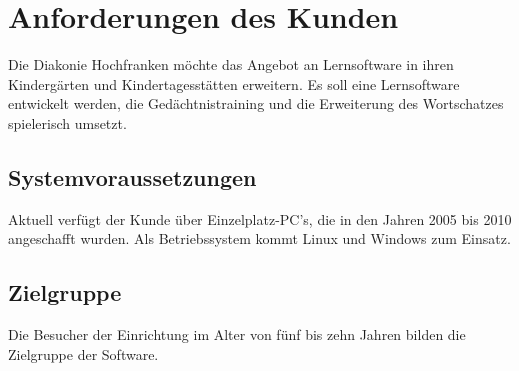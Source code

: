 \clearpage

\chapter{Anforderungen des Kunden}
Die Diakonie Hochfranken möchte das Angebot an Lernsoftware in ihren Kindergärten und Kindertagesstätten erweitern. Es soll eine Lernsoftware entwickelt werden, die Gedächtnistraining und die Erweiterung des Wortschatzes spielerisch umsetzt.

\section{Systemvoraussetzungen}
Aktuell verfügt der Kunde über Einzelplatz-PC's, die in den Jahren 2005 bis 2010 angeschafft wurden. Als Betriebssystem kommt Linux und Windows zum Einsatz.

\section{Zielgruppe}
Die Besucher der Einrichtung im Alter von fünf bis zehn Jahren bilden die Zielgruppe der Software. 


